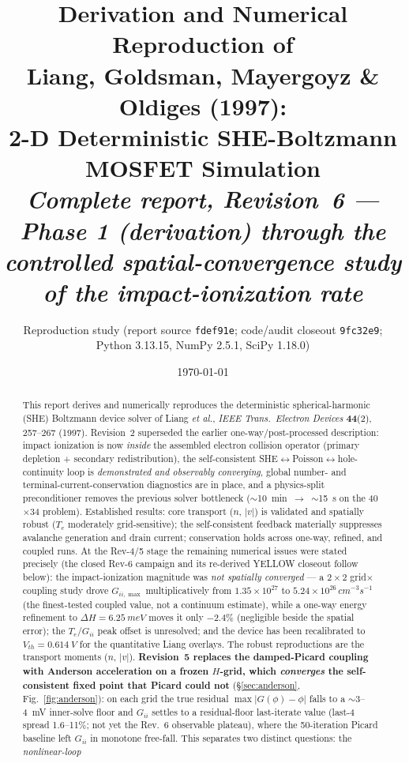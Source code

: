 \documentclass[11pt]{article}
\title{\textbf{Derivation and Numerical Reproduction of\\
Liang, Goldsman, Mayergoyz \& Oldiges (1997):\\
2-D Deterministic SHE-Boltzmann MOSFET Simulation}\\[5pt]
\large\textit{Complete report, Revision~6 --- Phase 1 (derivation) through the controlled spatial-convergence study of the impact-ionization rate}}
\author{Reproduction study \quad\small(report source \texttt{fdef91e}; code/audit closeout \texttt{9fc32e9}; Python 3.13.15, NumPy 2.5.1, SciPy 1.18.0)}
\date{\today}
\begin{document}
\maketitle

\begin{abstract}
\noindent
This report derives and numerically reproduces the deterministic spherical-harmonic (SHE)
Boltzmann device solver of Liang \emph{et al.}, \emph{IEEE Trans.\ Electron Devices}
\textbf{44}(2), 257--267 (1997). Revision~2 superseded the earlier one-way/post-processed
description: impact ionization is now \emph{inside} the assembled electron collision operator
(primary depletion + secondary redistribution), the self-consistent
SHE$\leftrightarrow$Poisson$\leftrightarrow$hole-continuity loop is \emph{demonstrated and
observably converging}, global number- and terminal-current-conservation diagnostics are in
place, and a physics-split preconditioner removes the previous solver bottleneck
($\sim$10~min~$\to$~$\sim$15~s on the 40$\times$34 problem). Established results: core
transport ($n$, $|v|$) is validated and spatially robust ($T_e$ moderately grid-sensitive); the
self-consistent feedback materially suppresses avalanche generation and drain current; conservation
holds across one-way, refined, and coupled runs. At the Rev-4/5 stage the remaining numerical issues
were stated precisely (the closed Rev-6 campaign and its re-derived YELLOW closeout follow below): the
impact-ionization magnitude was \emph{not spatially converged} --- a
$2\times2$ grid$\times$coupling study drove $G_{ii,\max}$ multiplicatively from
$1.35\times10^{27}$ to $5.24\times10^{26}\,\si{cm^{-3}s^{-1}}$ (the finest-tested coupled value,
not a continuum estimate), while a one-way energy refinement to $\Delta H=\SI{6.25}{meV}$ moves it
only $-2.4\%$ (negligible beside the spatial error); the $T_e$/$G_{ii}$ peak offset is unresolved;
and the device has been recalibrated to $V_{th}=\SI{0.614}{V}$ for the quantitative Liang overlays.
The robust reproductions are the transport moments ($n$, $|v|$). \textbf{Revision~5 replaces the
damped-Picard coupling with Anderson acceleration on a frozen $H$-grid, which \emph{converges} the
self-consistent fixed point that Picard could not} (\S\ref{sec:anderson}, Fig.~\ref{fig:anderson}):
on each grid the true residual $\max|G(\phi){-}\phi|$ falls to a $\sim$3--4~mV inner-solve floor and
$G_{ii}$ settles to a residual-floor last-iterate value (last-4 spread 1.6--11\%; not yet the
Rev.~6 observable plateau), where the 50-iteration Picard baseline left
$G_{ii}$ in monotone free-fall. This separates two distinct questions: the \emph{nonlinear-loop}

\end{abstract}
\end{document}
